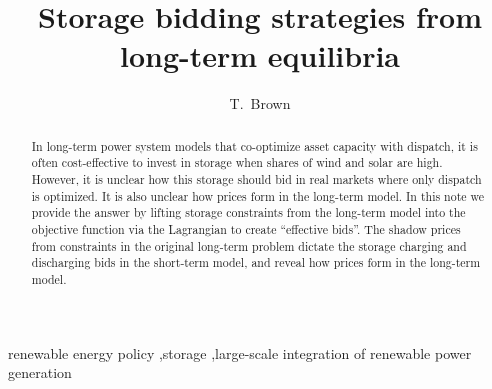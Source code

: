 \documentclass[final,3p,times]{elsarticle}
\begin{document}
\begin{frontmatter}





\title{Storage bidding strategies from long-term equilibria}



\author[kit]{T.~Brown}



\address[kit]{Institute for Automation and Applied Informatics, Karlsruhe Institute of Technology, Hermann-von-Helmholtz-Platz 1, 76344 Eggenstein-Leopoldshafen, Germany}


\begin{abstract}
  In long-term power system models that co-optimize asset capacity with
  dispatch, it is often cost-effective to invest in storage when
  shares of wind and solar are high. However, it is unclear how
  this storage should bid in real markets where only dispatch is
  optimized. It is also unclear how prices form in the long-term model.
  In this note we provide the answer by lifting storage
  constraints from the long-term model into the objective function via
  the Lagrangian to create ``effective bids''.
  The shadow prices from constraints in the
  original long-term problem dictate the storage charging and discharging bids in the short-term model, and reveal how prices form in the long-term model.
\end{abstract}


\begin{keyword}
 renewable energy policy \sep storage \sep large-scale integration of renewable power generation



\end{keyword}

\end{frontmatter}
\end{document}
